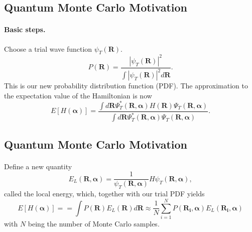 \documentclass[%
twoside,                 %
final,                   %
10pt]{article}
\begin{document}
\noindent




\subsection*{Quantum Monte Carlo Motivation}

\paragraph{Basic steps.}
Choose a trial wave function
$\psi_T(\bm{R})$.
\[
   P(\bm{R})= \frac{\left|\psi_T(\bm{R})\right|^2}{\int \left|\psi_T(\bm{R})\right|^2d\bm{R}}.
\]
This is our new probability distribution function  (PDF).
The approximation to the expectation value of the Hamiltonian is now 
\[
   E[H(\bm{\alpha})] = 
   \frac{\int d\bm{R}\Psi^{\ast}_T(\bm{R},\bm{\alpha})H(\bm{R})\Psi_T(\bm{R},\bm{\alpha})}
        {\int d\bm{R}\Psi^{\ast}_T(\bm{R},\bm{\alpha})\Psi_T(\bm{R},\bm{\alpha})}.
\]




\subsection*{Quantum Monte Carlo Motivation}

\paragraph{}
Define a new quantity
\[
   E_L(\bm{R},\bm{\alpha})=\frac{1}{\psi_T(\bm{R},\bm{\alpha})}H\psi_T(\bm{R},\bm{\alpha}),
   \label{eq:locale1}
\]
called the local energy, which, together with our trial PDF yields
\[
  E[H(\bm{\alpha})]= = \int P(\bm{R})E_L(\bm{R}) d\bm{R}\approx \frac{1}{N}\sum_{i=1}^NP(\bm{R_i},\bm{\alpha})E_L(\bm{R_i},\bm{\alpha})
  \label{eq:vmc1}
\]
with $N$ being the number of Monte Carlo samples.






\printindex
\end{document}
